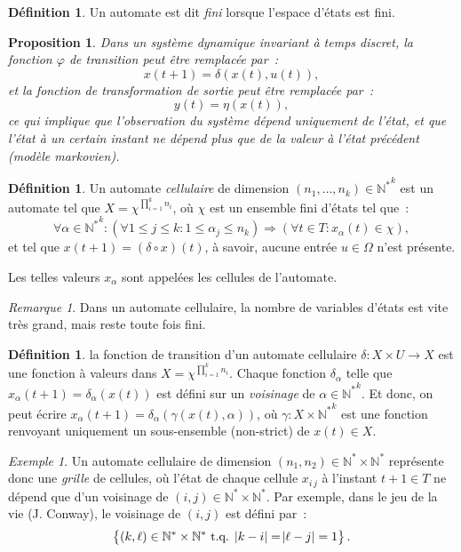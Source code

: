 \documentclass{article}
\newtheorem{prp}[thm]{Proposition}
\theoremstyle{definition}
\newtheorem{déf}[thm]{Définition}
\theoremstyle{remark}
\newtheorem*{rmq}{Remarque}
\newtheorem{ex}{Exemple}[section]
\newcommand{\N}{\mathbb N}
\newcommand{\tq}{\text{ t.q. }}
\begin{document}
	\begin{déf} Un automate est dit \textit{fini} lorsque l'espace d'états est fini.
	\end{déf}

	\begin{prp} Dans un système dynamique invariant à temps discret, la fonction $\varphi$ de transition peut être remplacée par~:
	\[x(t+1) = \delta(x(t), u(t)),\]
	et la fonction de transformation de sortie peut être remplacée par~:
	\[y(t) = \eta(x(t)),\]
	ce qui implique que l'observation du système dépend uniquement de l'état, et que l'état à un certain instant ne dépend plus que de la valeur à l'état
	précédent (modèle markovien).
	\end{prp}

	\begin{déf} Un automate \textit{cellulaire} de dimension $(n_1, \ldots, n_k) \in {\N^*}^k$ est un automate tel que $X = \chi^{\prod_{i=1}^kn_i}$, où $\chi$
	est un ensemble fini d'états tel que~:
	\[\forall \alpha \in {\N^*}^k : \left(\forall 1 \leq j \leq k : 1 \leq \alpha_j \leq n_k\right) \Rightarrow \left(\forall t \in T : x_\alpha(t) \in \chi\right),\]
	et tel que $x(t+1) = (\delta \circ x)(t)$, à savoir, aucune entrée $u \in \Omega$ n'est présente.

	Les telles valeurs $x_\alpha$ sont appelées les cellules de l'automate.
	\end{déf}

	\begin{rmq} Dans un automate cellulaire, la nombre de variables d'états est vite très grand, mais reste toute fois fini.
	\end{rmq}

	\begin{déf} la fonction de transition d'un automate cellulaire $\delta : X \times U \to X$ est une fonction à valeurs dans $X = \chi^{\prod_{i=1}^kn_i}$.
	Chaque fonction $\delta_\alpha$ telle que $x_\alpha(t+1) = \delta_\alpha(x(t))$ est défini sur un \textit{voisinage} de $\alpha \in {\N^*}^k$. Et donc,
	on peut écrire $x_\alpha(t+1) = \delta_\alpha\left(\gamma(x(t), \alpha)\right)$, où $\gamma : X \times {\N^*}^k$ est une fonction renvoyant uniquement
	un sous-ensemble (non-strict) de $x(t) \in X$.
	\end{déf}

	\begin{ex} Un automate cellulaire de dimension $(n_1, n_2) \in \N^* \times \N^*$ représente donc une \textit{grille} de cellules, où l'état de chaque cellule
	$x_{i\,j}$ à l'instant $t+1 \in T$ ne dépend que d'un voisinage de $(i, j) \in \N^* \times \N^*$. Par exemple, dans le jeu de la vie (J. Conway), le
	voisinage de $(i, j)$ est défini par~:
	\[\left\{(k, \ell) \in \N^* \times \N^* \tq \abs {k-i} = \abs {\ell-j} = 1\right\}.\]
	\end{ex}
\end{document}
